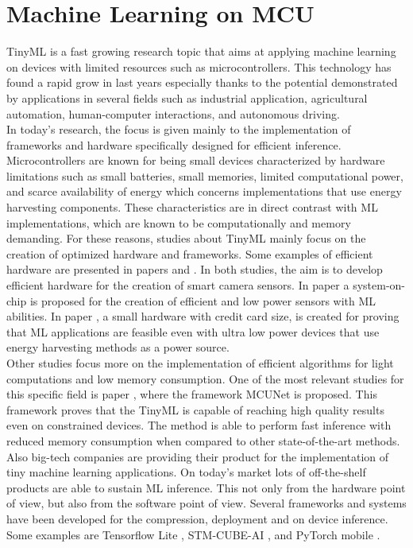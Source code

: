 \documentclass[12pt]{report}
\begin{document}
\section{Machine Learning on MCU}
\label{iot_pro}
TinyML is a fast growing research topic that aims at applying machine learning on devices with limited resources such as microcontrollers. This technology has found a rapid grow in last years especially thanks to the potential demonstrated by applications in several fields such as industrial application, agricultural automation, human-computer interactions, and autonomous driving. \\
In today's research, the focus is given mainly to the implementation of frameworks and hardware specifically designed for efficient inference. Microcontrollers are known for being small devices characterized by hardware limitations such as small batteries, small memories, limited computational power, and scarce availability of energy which concerns implementations that use energy harvesting components. These characteristics are in direct contrast with ML implementations, which are known to be computationally and memory demanding. For these reasons, studies about TinyML mainly focus on the creation of optimized hardware and frameworks. Some examples of efficient hardware are presented in papers \cite{jokic2021battery} and \cite{jokic2021sub}. In both studies, the aim is to develop efficient hardware for the creation of smart camera sensors. In paper \cite{jokic2021sub} a system-on-chip is proposed for the creation of efficient and low power sensors with ML abilities. In paper \cite{jokic2021battery}, a small hardware with credit card size, is created for proving that ML applications are feasible even with ultra low power devices that use energy harvesting methods as a power source.\\
Other studies focus more on the implementation of efficient algorithms for light computations and low memory consumption. One of the most relevant studies for this specific field is paper \cite{lin2020mcunet}, where the framework MCUNet is proposed. This framework proves that the TinyML is capable of reaching high quality results even on constrained devices. The method is able to perform fast inference with reduced memory consumption when compared to other state-of-the-art methods.\\
Also big-tech companies are providing their product for the implementation of tiny machine learning applications. On today's market lots of off-the-shelf products are able to sustain ML inference. This not only from the hardware point of view, but also from the software point of view. Several frameworks and systems have been developed for the compression, deployment and on device inference. Some examples are Tensorflow Lite \cite{TF_lite}, STM-CUBE-AI \cite{stm_cube_ai}, and PyTorch mobile \cite{pytorch_mobile}.
\end{document}
